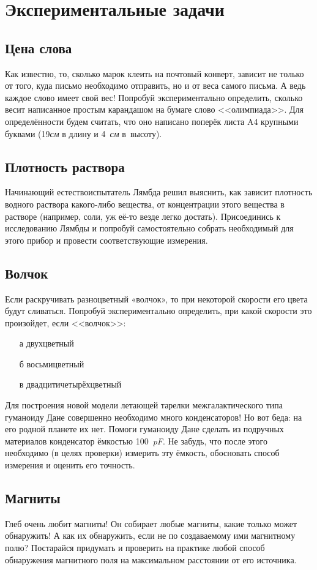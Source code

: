 \documentclass[a4paper,12pt]{article}
\begin{document}
\section{Экспериментальные задачи}

\subsection{Цена слова}
Как известно, то, сколько марок клеить на почтовый конверт, зависит не только от того,
куда письмо необходимо отправить, но и от веса самого письма. А ведь каждое слово имеет
свой вес! Попробуй экспериментально определить, сколько весит написанное простым
карандашом на бумаге слово <<олимпиада>>. Для определённости будем считать, что
оно написано поперёк листа A4 крупными буквами (19\emph{см} в длину и 4~\emph{см} в~высоту).

\subsection{Плотность раствора}
Начинающий естествоиспытатель Лямбда решил выяснить, как зависит плотность
водного раствора какого-либо вещества, от концентрации этого вещества
в растворе (например, соли, уж её-то везде легко достать). Присоединись
к исследованию Лямбды и попробуй самостоятельно собрать необходимый
для этого прибор и провести соответствующие измерения.

\subsection{Волчок}
Если раскручивать разноцветный «волчок», то при некоторой скорости его цвета будут сливаться.
Попробуй экспериментально определить, при какой скорости это произойдет, если <<волчок>>:\\
\begin{enumerate}
\item[а] двухцветный
\item[б] восьмицветный
\item[в] двадцитичетырёхцветный
\end{enumerate}

Для построения новой модели летающей тарелки межгалактического типа гуманоиду Дане
совершенно необходимо много конденсаторов! Но вот беда: на его родной планете их нет.
Помоги гуманоиду Дане сделать из подручных материалов конденсатор ёмкостью 100~\emph{pF}.
Не забудь, что после этого необходимо (в  целях проверки) измерить эту ёмкость,
обосновать способ измерения и оценить его точность.

\subsection{Магниты}
Глеб очень любит магниты! Он собирает любые магниты, какие только может обнаружить!
А как их обнаружить, если не по создаваемому ими магнитному полю? Постарайся придумать
и проверить на практике любой способ обнаружения магнитного поля
на максимальном расстоянии от его источника.

\end{document}
